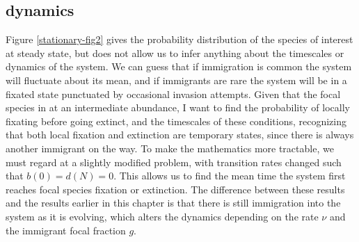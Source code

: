 \subsection{dynamics}
Figure \ref{stationary-fig2} gives the probability distribution of the species of interest at steady state, but does not allow us to infer anything about the timescales or dynamics of the system. 
We can guess that if immigration is common the system will fluctuate about its mean, and if immigrants are rare the system will be in a fixated state punctuated by occasional invasion attempts. 
Given that the focal species in at an intermediate abundance, I want to find the probability of locally fixating before going extinct, and the timescales of these conditions, recognizing that both local fixation and extinction are temporary states, since there is always another immigrant on the way. 
To make the mathematics more tractable, we must regard at a slightly modified problem, with transition rates changed such that $b(0)=d(N)=0$. 
This allows us to find the mean time the system first reaches focal species fixation or extinction. %
The difference between these results and the results earlier in this chapter is that there is still immigration into the system as it is evolving, which alters the dynamics depending on the rate $\nu$ and the immigrant focal fraction $g$. 

